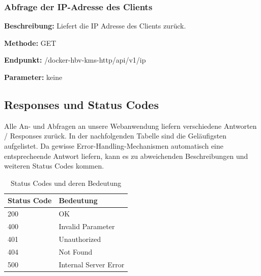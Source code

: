 \subsubsection{Abfrage der IP-Adresse des Clients}
\label{sec:api-client-ip}
\textbf{Beschreibung:} Liefert die IP Adresse des Clients zurück.

\textbf{Methode:} GET

\textbf{Endpunkt:} /docker-hbv-kms-http/api/v1/ip

\textbf{Parameter:} keine

\dotfill


\subsection{Responses und Status Codes}
\label{sec:nodechapter-implementation-responses}
Alle An- und Abfragen an unsere Webanwendung liefern verschiedene Antworten / Responses zurück. In der nachfolgenden Tabelle sind die Geläufigsten aufgelistet. Da gewisse Error-Handling-Mechanismen automatisch eine entsprecheende Antwort liefern, kann es zu abweichenden Beschreibungen und weiteren Status Codes kommen.
\begin{table}[H]
    \caption{Status Codes und deren Bedeutung}
    \label{tab:responsecodes}
    \setlength{\tabcolsep}{3pt}
    \begin{tabular}{p{100pt}p{280pt}}
        Status Code & Bedeutung             \\
        \midrule
        200         & OK                    \\
        400         & Invalid Parameter     \\
        401         & Unauthorized          \\
        404         & Not Found             \\
        500         & Internal Server Error \\
        \bottomrule
    \end{tabular}
\end{table}


